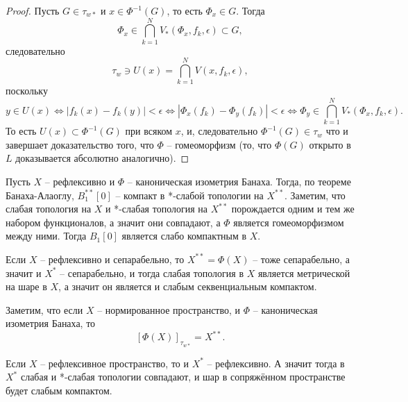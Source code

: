 \begin{proof}
    Пусть $G \in \tau_{w*}$ и $x \in \Phi^{-1}(G)$, то есть $\Phi_x \in G$.
    Тогда
    \[
        \Phi_x \in \bigcap_{k = 1}^{N} V_*(\Phi_x, f_k, \epsilon) \subset G,
    \]
    следовательно
    \[
        \tau_w \ni U(x) = \bigcap_{k = 1}^{N} V(x, f_k, \epsilon),
    \]
    поскольку \[y \in U(x) \Longleftrightarrow |f_k(x) - f_k(y)| <\epsilon \Longleftrightarrow |\Phi_x(f_k) - \Phi_y(f_k)| < \epsilon \Longleftrightarrow \Phi_y \in \bigcap_{k = 1}^{N} V_*(\Phi_x, f_k, \epsilon).\]
    То есть $U(x) \subset \Phi^{-1}(G)$ при всяком $x$, и, следовательно $\Phi^{-1}(G) \in \tau_w$ что и завершает доказательство того, что $\Phi$ -- гомеоморфизм (то, что $\Phi(G)$ открыто в $L$ доказывается абсолютно аналогично).
\end{proof}
\begin{corollary}
    Пусть $X$ -- рефлексивно и $\Phi$ -- каноническая изометрия Банаха.
    Тогда, по теореме Банаха-Алаоглу, $B_1^{**}[0]$ -- компакт в *-слабой топологии на $X^{**}$.
    Заметим, что слабая топология на $X$ и *-слабая топология на $X^{**}$ порождается одним и тем же набором функционалов, а значит они совпадают, а $\Phi$ является гомеоморфизмом между ними.
    Тогда $B_1[0]$ является слабо компактным в $X$.
\end{corollary}
\begin{note}
    Если $X$ -- рефлексивно и сепарабельно, то $X^{**} = \Phi(X)$ -- тоже сепарабельно, а значит и $X^*$ -- сепарабельно, и тогда слабая топология в $X$ является метрической на шаре в $X$, а значит он является и слабым секвенциальным компактом.
\end{note}
\begin{note}
    Заметим, что если $X$ -- нормированное пространство, и $\Phi$ -- каноническая изометрия Банаха, то
    \[
        [\Phi(X)]_{\tau_{w*}} = X^{**}.
    \]
\end{note}
\begin{note}
    Если $X$ -- рефлексивное пространство, то и $X^*$ -- рефлексивно.
    А значит тогда в $X^*$ слабая и *-слабая топологии совпадают, и шар в сопряжённом пространстве будет слабым компактом.
\end{note}

